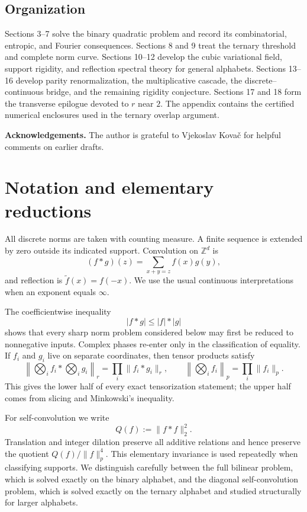 \documentclass[11pt,reqno]{amsart}
\numberwithin{equation}{section}
\theoremstyle{definition}
\theoremstyle{remark}
\newcommand{\Z}{\mathbb Z}
\newcommand{\rev}{\widetilde}
\begin{document}
\subsection{Organization}
Sections 3--7 solve the binary quadratic problem and record its combinatorial, entropic, and Fourier consequences.  Sections 8 and 9 treat the ternary threshold and complete norm curve.  Sections 10--12 develop the cubic variational field, support rigidity, and reflection spectral theory for general alphabets.  Sections 13--16 develop parity renormalization, the multiplicative cascade, the discrete--continuous bridge, and the remaining rigidity conjecture.  Sections 17 and 18 form the transverse epilogue devoted to $r$ near $2$.  The appendix contains the certified numerical enclosures used in the ternary overlap argument.

\par\medskip
\noindent\textbf{Acknowledgements.}\enspace
The author is grateful to Vjekoslav Kova\v{c} for helpful comments on earlier drafts.

\section{Notation and elementary reductions}\label{sec:notation}
All discrete norms are taken with counting measure.  A finite sequence is extended by zero outside its indicated support.  Convolution on $\Z^d$ is
\[
  (f*g)(z)=\sum_{x+y=z}f(x)g(y),
\]
and reflection is $\rev f(x)=f(-x)$.  We use the usual continuous interpretations when an exponent equals $\infty$.

The coefficientwise inequality
\begin{equation}\label{eq:nonnegative-reduction}
  |f*g|\le |f|*|g|
\end{equation}
shows that every sharp norm problem considered below may first be reduced to nonnegative inputs.  Complex phases re-enter only in the classification of equality.  If $f_i$ and $g_i$ live on separate coordinates, then tensor products satisfy
\begin{equation}\label{eq:tensor-factorization-common}
  \left\|\bigotimes_i f_i * \bigotimes_i g_i\right\|_r
  =\prod_i\|f_i*g_i\|_r,
  \qquad
  \left\|\bigotimes_i f_i\right\|_p=\prod_i\|f_i\|_p.
\end{equation}
This gives the lower half of every exact tensorization statement; the upper half comes from slicing and Minkowski's inequality.

For self-convolution we write
\[
  Q(f):=\|f*f\|_2^2.
\]
Translation and integer dilation preserve all additive relations and hence preserve the quotient $Q(f)/\|f\|_p^4$.  This elementary invariance is used repeatedly when classifying supports.  We distinguish carefully between the full bilinear problem, which is solved exactly on the binary alphabet, and the diagonal self-convolution problem, which is solved exactly on the ternary alphabet and studied structurally for larger alphabets.
\end{document}
